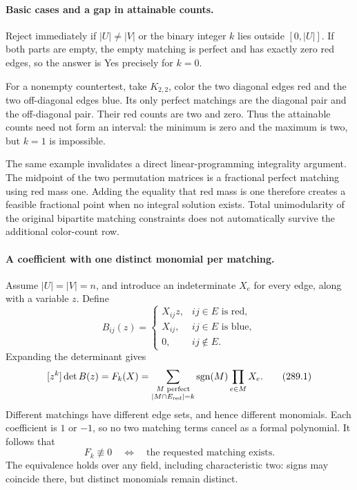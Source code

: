 \documentclass[11pt]{article}
\begin{document}
\paragraph{Basic cases and a gap in attainable counts.}
Reject immediately if $|U|\ne|V|$ or the binary integer $k$ lies outside $[0,|U|]$. If both parts are empty, the empty matching is perfect and has exactly zero red edges, so the answer is Yes precisely for $k=0$.

For a nonempty countertest, take $K_{2,2}$, color the two diagonal edges red and the two off-diagonal edges blue. Its only perfect matchings are the diagonal pair and the off-diagonal pair. Their red counts are two and zero. Thus the attainable counts need not form an interval: the minimum is zero and the maximum is two, but $k=1$ is impossible.

The same example invalidates a direct linear-programming integrality argument. The midpoint of the two permutation matrices is a fractional perfect matching using red mass one. Adding the equality that red mass is one therefore creates a feasible fractional point when no integral solution exists. Total unimodularity of the original bipartite matching constraints does not automatically survive the additional color-count row.

\paragraph{A coefficient with one distinct monomial per matching.}
Assume $|U|=|V|=n$, and introduce an indeterminate $X_e$ for every edge, along with a variable $z$. Define
\[
 B_{ij}(z)=
 \begin{cases}
 X_{ij}z,&ij\in E\text{ is red},\\
 X_{ij},&ij\in E\text{ is blue},\\
 0,&ij\notin E.
 \end{cases}
\]
Expanding the determinant gives
\[
 [z^k]\det B(z)
 =F_k(X)
 =\sum_{\substack{M\text{ perfect}\\|M\cap E_{\rm red}|=k}}
       \operatorname{sgn}(M)\prod_{e\in M}X_e.
 \tag{289.1}
\]
Different matchings have different edge sets, and hence different monomials. Each coefficient is $1$ or $-1$, so no two matching terms cancel as a formal polynomial. It follows that
\[
 F_k\not\equiv0
 \quad\Longleftrightarrow\quad
 \text{the requested matching exists}.
\]
The equivalence holds over any field, including characteristic two: signs may coincide there, but distinct monomials remain distinct.
\end{document}
